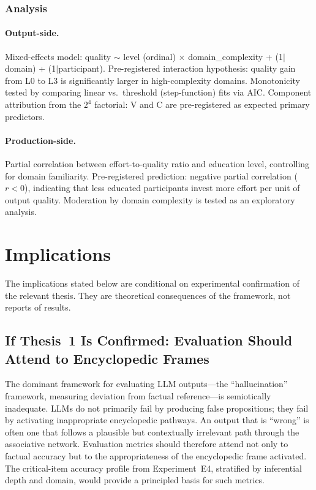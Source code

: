 \documentclass[12pt,a4paper]{article}
\begin{document}
\subsubsection{Analysis}

\paragraph{Output-side.} Mixed-effects model: quality $\sim$ level (ordinal)
$\times$ domain\_complexity + (1$|$domain) + (1$|$participant). Pre-registered
interaction hypothesis: quality gain from L0 to L3 is significantly larger
in high-complexity domains. Monotonicity tested by comparing linear vs.\
threshold (step-function) fits via AIC. Component attribution from the
$2^4$ factorial: V and C are pre-registered as expected primary predictors.

\paragraph{Production-side.} Partial correlation between effort-to-quality
ratio and education level, controlling for domain familiarity. Pre-registered
prediction: negative partial correlation ($r < 0$), indicating that less
educated participants invest more effort per unit of output quality. Moderation
by domain complexity is tested as an exploratory analysis.


\section{Implications}
\label{sec:implications}

The implications stated below are conditional on experimental confirmation
of the relevant thesis. They are theoretical consequences of the framework,
not reports of results.

\subsection{If Thesis~1 Is Confirmed: Evaluation Should Attend to
Encyclopedic Frames}

The dominant framework for evaluating LLM outputs---the ``hallucination''
framework, measuring deviation from factual reference---is semiotically
inadequate. LLMs do not primarily fail by producing false propositions; they
fail by activating inappropriate encyclopedic pathways. An output that is
``wrong'' is often one that follows a plausible but contextually irrelevant
path through the associative network. Evaluation metrics should therefore
attend not only to factual accuracy but to the appropriateness of the
encyclopedic frame activated. The critical-item accuracy profile from
Experiment~E4, stratified by inferential depth and domain, would provide
a principled basis for such metrics.
\end{document}
